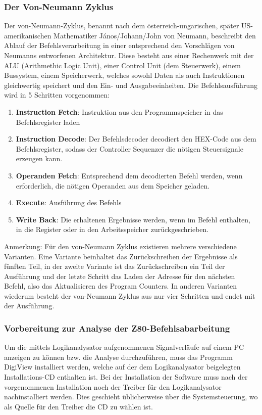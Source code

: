 \subsubsection{Der Von-Neumann Zyklus}
Der von-Neumann-Zyklus, benannt nach dem österreich-ungarischen, später US-amerikanischen Mathematiker János/Johann/John von Neumann, beschreibt den Ablauf der Befehlsverarbeitung in einer entsprechend den Vorschlägen von Neumanns entworfenen Architektur. Diese besteht aus einer Rechenwerk mit der ALU (Arithmethic Logic Unit), einer Control Unit (dem Steuerwerk), einem Bussystem, einem Speicherwerk, welches sowohl Daten als auch Instruktionen gleichwertig speichert und den Ein- und Ausgabeeinheiten. Die Befehlsausführung wird in 5 Schritten vorgenommen:

\begin{enumerate}
    \item \textbf{Instruction Fetch}: Instruktion aus den Programmspeicher in das Befehlsregister laden
    \item \textbf{Instruction Decode}: Der Befehlsdecoder decodiert den HEX-Code aus dem Befehlsregister, sodass der Controller Sequenzer die nötigen Steuersignale erzeugen kann.
    \item \textbf{Operanden Fetch}: Entsprechend dem decodierten Befehl werden, wenn erforderlich, die nötigen Operanden aus dem Speicher geladen.
    \item \textbf{Execute}: Ausführung des Befehls
    \item \textbf{Write Back}: Die erhaltenen Ergebnisse werden, wenn im Befehl enthalten, in die Register oder in den Arbeitsspeicher zurückgeschrieben.
\end{enumerate}
\begin{warning}
    Anmerkung: Für den von-Neumann Zyklus existieren mehrere verschiedene Varianten. Eine Variante beinhaltet das Zurückschreiben der Ergebnisse als fünften Teil, in der zweite Variante ist das Zurückschreiben ein Teil der Ausführung und der letzte Schritt das Laden der Adresse für den nächsten Befehl, also das Aktualisieren des Program Counters. In anderen Varianten wiederum besteht der von-Neumann Zyklus aus nur vier Schritten und endet mit der Ausführung.
\end{warning}

\subsubsection{Vorbereitung zur Analyse der Z80-Befehlsabarbeitung}
Um die mittels Logikanalysator aufgenommenen Signalverläufe auf einem PC anzeigen zu können bzw. die Analyse durchzuführen, muss das Programm DigiView installiert werden, welche auf der dem Logikanalysator beigelegten Installations-CD enthalten ist. Bei der Installation der Software muss nach der vorgenommenen Installation noch der Treiber für den Logikanalysator nachinstalliert werden. Dies geschieht üblicherweise über die Systemsteuerung, wo als Quelle für den Treiber die CD zu wählen ist.


